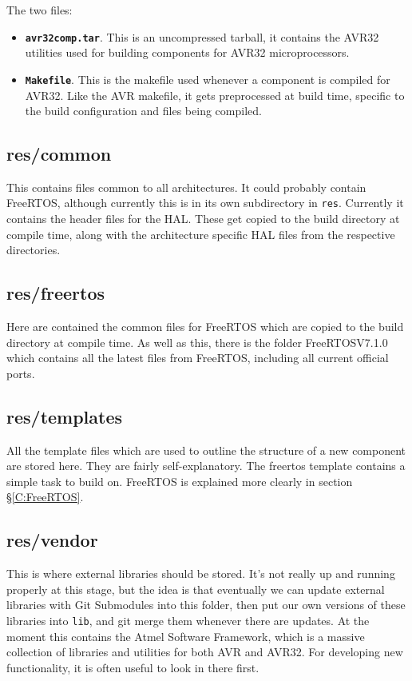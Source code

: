\documentclass[a4paper, oneside, 11pt, titlepage, onecolumn, openright]{report}
\begin{document}
The two files:

\begin{itemize}

\item \textbf{\texttt{avr32comp.tar}}. This is an uncompressed tarball, it contains the AVR32 utilities used for building components for AVR32 microprocessors.

\item \textbf{\texttt{Makefile}}. This is the makefile used whenever a component is compiled for AVR32. Like the AVR makefile, it gets preprocessed at build time, specific to the build configuration and files being compiled.

\end{itemize}

\subsection{res/common}
			\label{ss:res/commmon}
			This contains files common to all architectures. It could probably contain FreeRTOS, although currently this is in its own subdirectory in \texttt{res}. Currently it contains the header files for the HAL. These get copied to the build directory at compile time, along with the architecture specific HAL files from the respective directories.
			
		
\subsection{res/freertos}
			\label{ss:res/freertos}
			Here are contained the common files for FreeRTOS which are copied to the build directory at compile time. As well as this, there is the folder FreeRTOSV7.1.0 which contains all the latest files from FreeRTOS, including all current official ports. 
			
\subsection{res/templates}
			\label{ss:res/templates}
			All the template files which are used to outline the structure of a new component are stored here. They are fairly self-explanatory. The freertos template contains a simple task to build on. FreeRTOS is explained more clearly in section \S\ref{C:FreeRTOS}.
			
\subsection{res/vendor}
			\label{ss:res/vendor}
			This is where external libraries should be stored. It's not really up and running properly at this stage, but the idea is that eventually we can update external libraries with Git Submodules into this folder, then put our own versions of these libraries into \texttt{lib}, and git merge them whenever there are updates. At the moment this contains the Atmel Software Framework, which is a massive collection of libraries and utilities for both AVR and AVR32. For developing new functionality, it is often useful to look in there first.
			
\end{document}
